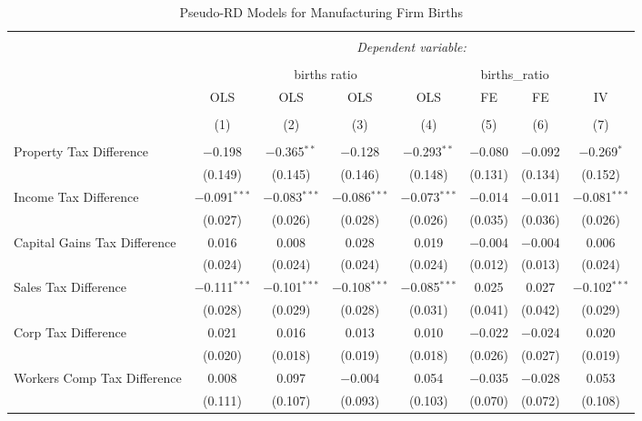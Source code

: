 
\begin{table}[!htbp] \centering 
  \caption{Pseudo-RD Models for  Manufacturing Firm Births} 
  \label{} 
\begin{tabular}{@{\extracolsep{5pt}}lccccccc} 
\\[-1.8ex]\hline 
\hline \\[-1.8ex] 
 & \multicolumn{7}{c}{\textit{Dependent variable:}} \\ 
\cline{2-8} 
\\[-1.8ex] & \multicolumn{4}{c}{births ratio} & \multicolumn{2}{c}{births\_ratio} &   \\ 
 & OLS & OLS & OLS & OLS & FE & FE & IV \\ 
\\[-1.8ex] & (1) & (2) & (3) & (4) & (5) & (6) & (7)\\ 
\hline \\[-1.8ex] 
 Property Tax Difference & $-$0.198 & $-$0.365$^{**}$ & $-$0.128 & $-$0.293$^{**}$ & $-$0.080 & $-$0.092 & $-$0.269$^{*}$ \\ 
  & (0.149) & (0.145) & (0.146) & (0.148) & (0.131) & (0.134) & (0.152) \\ 
  Income Tax Difference & $-$0.091$^{***}$ & $-$0.083$^{***}$ & $-$0.086$^{***}$ & $-$0.073$^{***}$ & $-$0.014 & $-$0.011 & $-$0.081$^{***}$ \\ 
  & (0.027) & (0.026) & (0.028) & (0.026) & (0.035) & (0.036) & (0.026) \\ 
  Capital Gains Tax Difference & 0.016 & 0.008 & 0.028 & 0.019 & $-$0.004 & $-$0.004 & 0.006 \\ 
  & (0.024) & (0.024) & (0.024) & (0.024) & (0.012) & (0.013) & (0.024) \\ 
  Sales Tax Difference & $-$0.111$^{***}$ & $-$0.101$^{***}$ & $-$0.108$^{***}$ & $-$0.085$^{***}$ & 0.025 & 0.027 & $-$0.102$^{***}$ \\ 
  & (0.028) & (0.029) & (0.028) & (0.031) & (0.041) & (0.042) & (0.029) \\ 
  Corp Tax Difference & 0.021 & 0.016 & 0.013 & 0.010 & $-$0.022 & $-$0.024 & 0.020 \\ 
  & (0.020) & (0.018) & (0.019) & (0.018) & (0.026) & (0.027) & (0.019) \\ 
  Workers Comp Tax Difference & 0.008 & 0.097 & $-$0.004 & 0.054 & $-$0.035 & $-$0.028 & 0.053 \\ 
  & (0.111) & (0.107) & (0.093) & (0.103) & (0.070) & (0.072) & (0.108) \\ 

\end{tabular}
\end{table}
